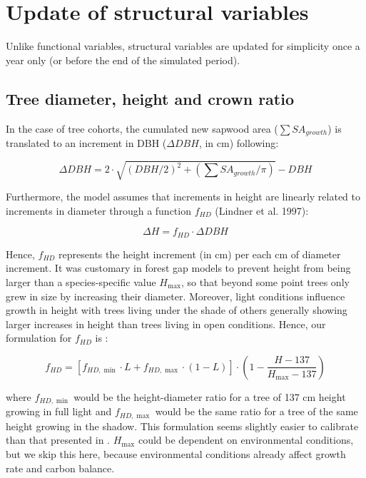 \documentclass[]{book}
\begin{document}
\chapter{Update of structural
variables}\label{update-of-structural-variables}

Unlike functional variables, structural variables are updated for
simplicity once a year only (or before the end of the simulated period).

\section{Tree diameter, height and crown
ratio}\label{tree-diameter-height-and-crown-ratio}

In the case of tree cohorts, the cumulated new sapwood area
(\(\sum{SA_{growth}}\)) is translated to an increment in DBH
(\(\Delta DBH\), in cm) following:

\begin{equation}
\Delta DBH = 2 \cdot \sqrt{(DBH/2)^2+(\sum{SA_{growth}}/\pi)} - DBH
\end{equation}

Furthermore, the model assumes that increments in height are linearly
related to increments in diameter through a function \(f_{HD}\) (Lindner
et al. 1997):

\begin{equation}
\Delta H = f_{HD} \cdot \Delta DBH
\end{equation}

Hence, \(f_{HD}\) represents the height increment (in cm) per each cm of
diameter increment. It was customary in forest gap models to prevent
height from being larger than a species-specific value \(H_{\max}\), so
that beyond some point trees only grew in size by increasing their
diameter. Moreover, light conditions influence growth in height with
trees living under the shade of others generally showing larger
increases in height than trees living in open conditions. Hence, our
formulation for \(f_{HD}\) is \citep{Lindner1997, Rasche2012}:

\begin{equation}
f_{HD} = \left[f_{HD,\min} \cdot L + f_{HD,\max} \cdot (1-L) \right] \cdot \left( 1 - \frac{H-137}{H_{\max} - 137} \right)
\end{equation}

where \(f_{HD,\min}\) would be the height-diameter ratio for a tree of
137 cm height growing in full light and \(f_{HD,\max}\) would be the
same ratio for a tree of the same height growing in the shadow. This
formulation seems slightly easier to calibrate than that presented in
\citet{Rasche2012}. \(H_{\max}\) could be dependent on environmental
conditions, but we skip this here, because environmental conditions
already affect growth rate and carbon balance.
\end{document}
